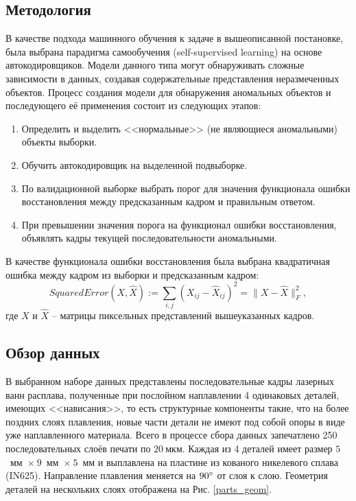 \documentclass{article}
\begin{document}
\subsection{Методология}
    В качестве подхода машинного обучения к задаче в вышеописанной постановке, была выбрана парадигма самообучения (self-supervised learning) на основе автокодировщиков. Модели данного типа могут обнаруживать сложные зависимости в данных, создавая содержательные представления неразмеченных объектов. Процесс создания модели для обнаружения аномальных объектов и последующего её применения состоит из следующих этапов:\begin{enumerate}
        \item Определить и выделить <<нормальные>> (не являющиеся аномальными) объекты выборки.
        \item Обучить автокодировщик на выделенной подвыборке.
        \item По валидационной выборке выбрать порог для значения функционала ошибки восстановления между предсказанным кадром и правильным ответом.
        \item При превышении значения порога на функционал ошибки восстановления, объявлять кадры текущей последовательности аномальными.
    \end{enumerate}
    В качестве функционала ошибки восстановления была выбрана квадратичная ошибка между кадром из выборки и предсказанным кадром: \begin{equation}\label{mse}
        SquaredError(X, \hat{X}) := \sum\limits_{i, j} (X_{ij} - \hat{X}_{ij})^2 = \|X - \hat{X}\|_F^2,
    \end{equation} где $X$ и $\hat{X}$ -- матрицы пиксельных представлений вышеуказанных кадров. 
    

\subsection{Обзор данных}
    В выбранном наборе данных представлены последовательные кадры лазерных ванн расплава, полученные при послойном наплавлении 4 одинаковых деталей, имеющих <<нависания>>, то есть структурные компоненты такие, что на более поздних слоях плавления, новые части детали не имеют под собой опоры в виде уже наплавленного материала. Всего в процессе сбора данных запечатлено 250 последовательных слоёв печати по $20~мкм$. Каждая из 4 деталей имеет размер $5$~мм~$\times~9$~мм~$\times~5$~мм и выплавлена на пластине из кованого никелевого сплава (IN625). Направление плавления меняется на $90\degree$ от слоя к слою. Геометрия деталей на нескольких слоях отображена на Рис. \ref{parts_geom}.
\end{document}
